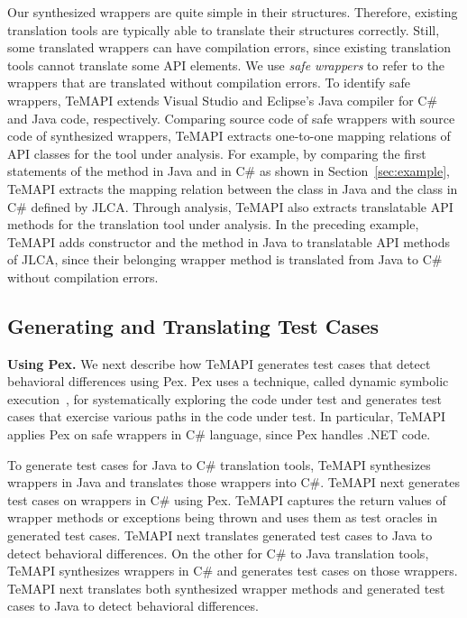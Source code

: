 Our synthesized wrappers are quite simple in their structures. Therefore, existing translation tools are typically able to translate their structures correctly. Still, some translated wrappers can have compilation errors, since existing translation tools cannot translate some API elements. We use \emph{safe wrappers} to refer to the wrappers that are translated without compilation errors. To identify safe wrappers, TeMAPI extends Visual Studio and Eclipse's Java compiler for C\# and Java code, respectively. Comparing source code of safe wrappers with source code of synthesized wrappers, TeMAPI extracts one-to-one mapping relations of API classes for the tool under analysis. For example, by comparing the first statements of the  method in Java and in C\# as shown in Section~\ref{sec:example}, TeMAPI extracts the mapping relation between the  class in Java and the  class in C\# defined by JLCA. Through analysis, TeMAPI also extracts translatable API methods for the translation tool under analysis. In the preceding example, TeMAPI adds  constructor and the  method in Java to translatable API methods of JLCA, since their belonging wrapper method is translated from Java to C\# without compilation errors.

\subsection{Generating and Translating Test Cases}
\label{sec:approach:single}


\textbf{Using Pex.} We next describe how TeMAPI generates test cases that detect behavioral differences using Pex. Pex uses a technique, called dynamic symbolic execution~\cite{koushik:cute, godefroid:dart}, for systematically exploring the code under test and generates test cases that exercise various paths in the code under test. In particular, TeMAPI applies Pex on safe wrappers in C\# language, since Pex handles .NET code.


To generate test cases for Java to C\# translation tools, TeMAPI synthesizes wrappers in Java and translates those wrappers into C\#. TeMAPI next generates test cases on wrappers in C\# using Pex. TeMAPI captures the return values of wrapper methods or exceptions being thrown and uses them as test oracles in generated test cases. TeMAPI next translates generated test cases to Java to detect behavioral differences. On the other for C\# to Java translation tools, TeMAPI synthesizes wrappers in C\# and generates test cases on those wrappers. TeMAPI next translates both synthesized wrapper methods and generated test cases to Java to detect behavioral differences.

